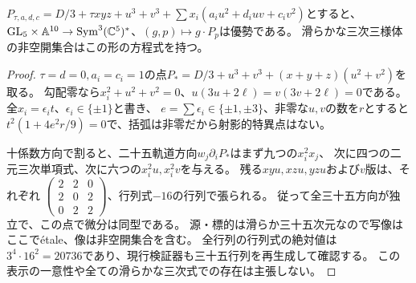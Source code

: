 \begin{proposition}[古典的な十係数表示の優勢性]
$P_{\tau,a,d,c}=D/3+\tau xyz+u^3+v^3+\sum x_i(a_iu^2+d_iuv+c_iv^2)$とすると、
$\mathrm{GL}_5\times\mathbb A^{10}\to\operatorname{Sym}^3(\mathbb C^5)^*$、$(g,p)\mapsto g\cdot P_p$は優勢である。
滑らかな三次三様体の非空開集合はこの形の方程式を持つ。
\end{proposition}
\begin{proof}
$\tau=d=0,a_i=c_i=1$の点$P_*=D/3+u^3+v^3+(x+y+z)(u^2+v^2)$を取る。
勾配零なら$x_i^2+u^2+v^2=0$、$u(3u+2\ell)=v(3v+2\ell)=0$である。
全$x_i=\epsilon_it$、$\epsilon_i\in\{\pm1\}$と書き、
$e=\sum\epsilon_i\in\{\pm1,\pm3\}$、非零な$u,v$の数を$r$とすると
$t^2(1+4e^2r/9)=0$で、括弧は非零だから射影的特異点はない。

十係数方向で割ると、二十五軌道方向$w_j\partial_iP_*$はまず九つの$x_i^2x_j$、
次に四つの二元三次単項式、次に六つの$x_i^2u,x_i^2v$を与える。
残る$xyu,xzu,yzu$および$v$版は、それぞれ
$\left(\begin{smallmatrix}2&2&0\\2&0&2\\0&2&2\end{smallmatrix}\right)$、行列式$-16$の行列で張られる。
従って全三十五方向が独立で、この点で微分は同型である。
源・標的は滑らか三十五次元なので写像はここでétale、像は非空開集合を含む。
全行列の行列式の絶対値は$3^4\cdot16^2=20736$であり、現行検証器も三十五行列を再生成して確認する。
この表示の一意性や全ての滑らかな三次式での存在は主張しない。
\end{proof}
